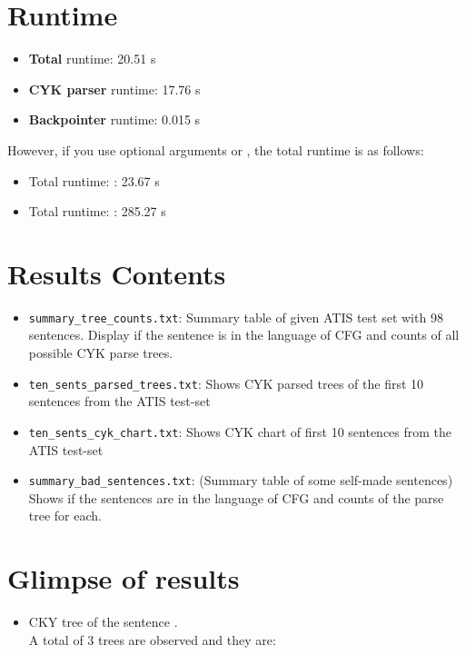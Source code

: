 \documentclass{article}[a4paper]
\begin{document}
\section{Runtime}
\begin{itemize}
    \item \textbf{Total} runtime: 20.51 s
    \item \textbf{CYK parser} runtime: 17.76 s
    \item \textbf{Backpointer} runtime: 0.015 s
\end{itemize}
However, if you use optional arguments  or , the total runtime is as follows:
\begin{itemize}
    \item Total runtime: : 23.67 s
    \item Total runtime: : 285.27 s
\end{itemize}

\section{Results Contents}
\begin{itemize}
    \item \texttt{summary\_tree\_counts.txt}: Summary table of given ATIS test set with 98 sentences. Display if the sentence is in the language of CFG and counts of all possible CYK parse trees.
    \item \texttt{ten\_sents\_parsed\_trees.txt}: Shows CYK parsed trees of the first 10 sentences from the ATIS test-set
    \item \texttt{ten\_sents\_cyk\_chart.txt}: Shows CYK chart of first 10 sentences from the ATIS test-set
    \item \texttt{summary\_bad\_sentences.txt}: (Summary table of some self-made sentences) Shows if the sentences are in the language of CFG and counts of the parse tree for each.
\end{itemize}

\section{Glimpse of results}
\begin{itemize}
    \item CKY tree of the sentence . \\
    A total of 3 trees are observed and they are:
\end{itemize}
\end{document}
